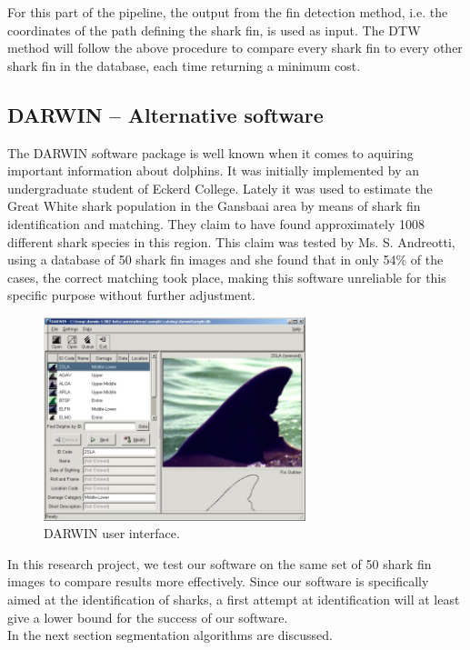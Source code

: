 \documentclass[a4paper,10pt]{article}
\begin{document}
For this part of the pipeline, the output from the fin detection method, i.e.
the coordinates of the path defining the shark fin, is used as input.  The DTW
method will follow the above procedure to compare every shark fin to every
other shark fin in the database, each time returning a minimum cost.  \\

\subsection{DARWIN -- Alternative software}
The DARWIN\cite{Darwin} software package is well known when it comes to
aquiring important information about dolphins.  It was initially implemented
by an undergraduate student of
Eckerd College.
Lately it was used to estimate the Great White shark population in the
Gansbaai area by means of shark fin identification and matching.  They claim to
have found approximately
1008 different shark species in this region.  This
claim was tested by Ms. S. Andreotti, using a database of 50 shark fin images and she found that in only
54\% of the cases, the correct matching took place, making this software
unreliable for this specific purpose without further adjustment.

\begin{figure}[H]
 \centering
 \includegraphics[width=3in]{Darwin.jpg}
 \caption{DARWIN user interface. \cite{Darwin}}
\end{figure}

In this research project, we test our software on the same set of 50 shark fin
images to compare results more effectively.
Since our software is specifically aimed at the identification of sharks, a first attempt at identification will at least 
give a lower bound for the success of our software. \\

In the next section segmentation algorithms are discussed.  
\end{document}
